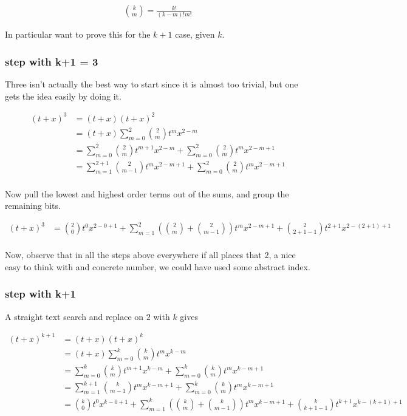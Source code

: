 \begin{align}
\binom{k}{m} = \frac{k!}{(k-m)!m!}
\end{align}

In particular want to prove this for the $k+1$ case, given $k$.

\subsubsection{step with k+1 = 3 }

Three isn't actually the best way to start since it is almost too trivial, but
one gets the idea easily by doing it.

\begin{align*}
(t + x)^3 
&= (t + x)(t + x)^2  \\
&= (t + x)\sum_{m=0}^2 \binom{2}{m} t^m x^{2-m} \\
&= 
\sum_{m=0}^2 \binom{2}{m} t^{m+1} x^{2-m} 
+ \sum_{m=0}^2 \binom{2}{m} t^{m} x^{2-m + 1} \\
&= 
\sum_{m=1}^{2 + 1} \binom{2}{m-1} t^{m} x^{2 - m + 1} 
+ \sum_{m=0}^2 \binom{2}{m} t^{m} x^{2-m + 1} \\
\end{align*}

Now pull the lowest and highest order terms out of the sums, and group the
remaining bits.

\begin{align*}
(t + x)^3 
&= 
 \binom{2}{0} t^{0} x^{2 - 0 + 1} 
+ \sum_{m=1}^{2} \left( \binom{2}{m} + \binom{2}{m-1} \right) t^{m} x^{2 - m + 1} 
+ \binom{2}{2 + 1 -1} t^{2 + 1} x^{2 - (2 + 1) + 1} 
\\
\end{align*}

Now, observe that in all the steps above everywhere if all places that $2$, a nice easy to think with and concrete number, we could have used some
abstract index.

\subsubsection{step with k+1 }

A straight text search and replace on $2$ with $k$ gives

\begin{align*}
(t + x)^{k+1}
&= (t + x)(t + x)^k  \\
&= (t + x)\sum_{m=0}^k \binom{k}{m} t^m x^{k-m} \\
&= 
\sum_{m=0}^k \binom{k}{m} t^{m+1} x^{k-m} 
+ \sum_{m=0}^k \binom{k}{m} t^{m} x^{k-m + 1} \\
&= 
\sum_{m=1}^{k + 1} \binom{k}{m-1} t^{m} x^{k - m + 1} 
+ \sum_{m=0}^k \binom{k}{m} t^{m} x^{k-m + 1} \\
&= 
 \binom{k}{0} t^{0} x^{k - 0 + 1} 
+ \sum_{m=1}^{k} \left( \binom{k}{m} + \binom{k}{m-1} \right) t^{m} x^{k - m + 1} 
+ \binom{k}{k + 1 -1} t^{k + 1} x^{k - (k + 1) + 1} \\
\end{align*}

